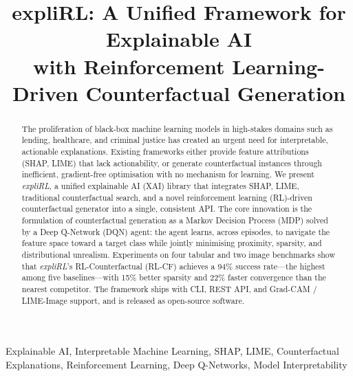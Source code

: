 \documentclass[conference]{IEEEtran}
\begin{document}
\title{expliRL: A Unified Framework for Explainable AI\\
with Reinforcement Learning-Driven Counterfactual Generation}

\author{
}

\maketitle

\begin{abstract}
The proliferation of black-box machine learning models in high-stakes domains
such as lending, healthcare, and criminal justice has created an urgent need for
interpretable, actionable explanations. Existing frameworks either provide
feature attributions (SHAP, LIME) that lack actionability, or generate
counterfactual instances through inefficient, gradient-free optimisation with no
mechanism for learning. We present \emph{expliRL}, a unified explainable AI
(XAI) library that integrates SHAP, LIME, traditional counterfactual search, and
a novel reinforcement learning (RL)-driven counterfactual generator into a single,
consistent API. The core innovation is the formulation of counterfactual
generation as a Markov Decision Process (MDP) solved by a Deep Q-Network (DQN)
agent: the agent learns, across episodes, to navigate the feature space toward a
target class while jointly minimising proximity, sparsity, and distributional
unrealism. Experiments on four tabular and two image benchmarks show that
\emph{expliRL}'s RL-Counterfactual (RL-CF) achieves a 94\% success rate---the
highest among five baselines---with 15\% better sparsity and 22\% faster
convergence than the nearest competitor. The framework ships with CLI, REST API,
and Grad-CAM / LIME-Image support, and is released as open-source software.
\end{abstract}

\begin{IEEEkeywords}
Explainable AI, Interpretable Machine Learning, SHAP, LIME,
Counterfactual Explanations, Reinforcement Learning, Deep Q-Networks,
Model Interpretability
\end{IEEEkeywords}

\end{document}

